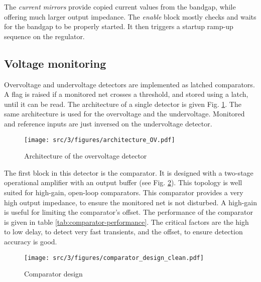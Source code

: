 The \textit{current mirrors} provide copied current values from the bandgap, while offering much larger output impedance.
The \textit{enable} block mostly checks and waits for the bandgap to be properly started.
It then triggers a startup ramp-up sequence on the regulator.

\subsection{Voltage monitoring}

Overvoltage and undervoltage detectors are implemented as latched comparators.
A flag is raised if a monitored net crosses a threshold, and stored using a latch, until it can be read.
The architecture of a single detector is given Fig. \ref{fig:architecture-ov}.
The same architecture is used for the overvoltage and the undervoltage.
Monitored and reference inputs are just inversed on the undervoltage detector.

\begin{figure}[!htbp]
  \centering
  \texttt{[image: src/3/figures/architecture\_OV.pdf]}
  \caption{Architecture of the overvoltage detector}
  \label{fig:architecture-ov}
\end{figure}

The first block in this detector is the comparator.
It is designed with a two-stage operational amplifier with an output buffer (see Fig. \ref{fig:comparator-design}).
This topology is well suited for high-gain, open-loop comparators.
This comparator provides a very high output impedance, to ensure the monitored net is not disturbed.
A high-gain is useful for limiting the comparator's offset.
The performance of the comparator is given in table \ref{tab:comparator-performance}.
The critical factors are the high to low delay, to detect very fast transients, and the offset, to ensure detection accuracy is good.

\begin{figure}[!htbp]
  \centering
  \texttt{[image: src/3/figures/comparator\_design\_clean.pdf]}
  \caption{Comparator design}
  \label{fig:comparator-design}
\end{figure}

